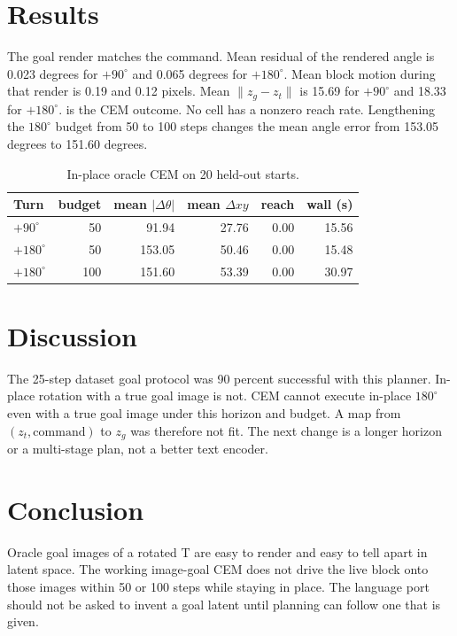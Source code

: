 \documentclass[11pt,a4paper]{article}
\begin{document}
\section{Results}
The goal render matches the command.
Mean residual of the rendered angle is 0.023 degrees for $+90^{\circ}$ and 0.065 degrees for $+180^{\circ}$.
Mean block motion during that render is 0.19 and 0.12 pixels.
Mean $\|z_g - z_t\|$ is 15.69 for $+90^{\circ}$ and 18.33 for $+180^{\circ}$.
 is the CEM outcome.
No cell has a nonzero reach rate.
Lengthening the $180^{\circ}$ budget from 50 to 100 steps changes the mean angle error from 153.05 degrees to 151.60 degrees.

\begin{table}[t]
\centering
\caption{In-place oracle CEM on 20 held-out starts.}
\label{tab:oracle}
\begin{tabular}{lrrrrr}
\toprule
Turn & budget & mean $|\Delta\theta|$ & mean $\Delta xy$ & reach & wall (s) \\
\midrule
$+90^{\circ}$ & 50 & 91.94 & 27.76 & 0.00 & 15.56 \\
$+180^{\circ}$ & 50 & 153.05 & 50.46 & 0.00 & 15.48 \\
$+180^{\circ}$ & 100 & 151.60 & 53.39 & 0.00 & 30.97 \\
\bottomrule
\end{tabular}
\end{table}

\section{Discussion}
The 25-step dataset goal protocol was 90 percent successful with this planner.
In-place rotation with a true goal image is not.
CEM cannot execute in-place $180^{\circ}$ even with a true goal image under this horizon and budget.
A map from $(z_t, \mathrm{command})$ to $z_g$ was therefore not fit.
The next change is a longer horizon or a multi-stage plan, not a better text encoder.

\section{Conclusion}
Oracle goal images of a rotated T are easy to render and easy to tell apart in latent space.
The working image-goal CEM does not drive the live block onto those images within 50 or 100 steps while staying in place.
The language port should not be asked to invent a goal latent until planning can follow one that is given.



\end{document}
